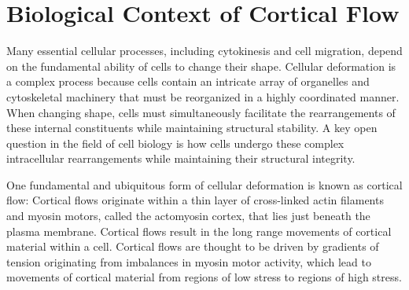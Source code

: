 \section{Biological Context of Cortical Flow}
Many essential cellular processes, including cytokinesis and cell migration, depend on the fundamental ability of cells to change their shape\cite{bhl28884}. Cellular deformation is a complex process because cells contain an intricate array of organelles and cytoskeletal machinery that must be reorganized in a highly coordinated manner. When changing shape, cells must simultaneously facilitate the rearrangements of these internal constituents while maintaining structural stability.   A key open question in the field of cell biology is how cells undergo these complex intracellular rearrangements while maintaining their structural integrity.

One fundamental and ubiquitous form of cellular deformation is known as cortical flow:  Cortical flows originate within a thin layer of cross-linked actin filaments and myosin motors, called the actomyosin cortex, that lies just beneath the plasma membrane\cite{Munro2004413}. Cortical flows result in the long range movements of cortical material within a cell\cite{doi:10.1146/annurev-cellbio-100109-104027}.  Cortical flows are thought to be driven by gradients of tension originating from imbalances in myosin motor activity, which lead to movements of  cortical material from regions of low stress to regions of high stress\cite{cellmech_flows3}.


